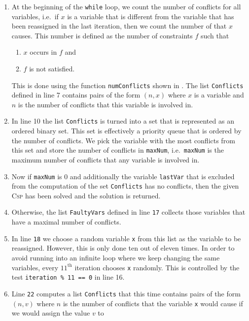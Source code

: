 \begin{enumerate}
\item At the beginning of the \texttt{while} loop, we count the number of conflicts for all variables, i.e.~if
      $x$ is a variable that is different from the variable that has been reassigned in the last iteration,
      then we count the number of   that $x$ causes.  This number is defined 
      as the number of constraints $f$ such that
      \begin{enumerate}
      \item $x$ occurs in $f$ and
      \item $f$ is not satisfied.
      \end{enumerate}
      This is done using the function \texttt{numConflicts} shown in .
      The list \texttt{Conflicts} defined in line 7 contains pairs of the form $(n, x)$ where $x$ is a
      variable and $n$ is the number of conflicts that this variable is involved in.
\item In line 10 the list \texttt{Conflicts} is turned into a set that is represented as an ordered binary set.
      This set is effectively a 
      priority queue that is ordered by the number of conflicts.  We pick the variable with the most conflicts
      from this set and store the number of conflicts in \texttt{maxNum}, i.e.~\texttt{maxNum} is the maximum
      number of conflicts that any variable is involved in.
\item Now if \texttt{maxNum} is $0$ and additionally the variable \texttt{lastVar} that is excluded from the
      computation of the set \texttt{Conflicts} has no conflicts, then the given \textsc{Csp} has been solved and
      the solution is returned.
\item Otherwise, the list  \texttt{FaultyVars} defined in line \texttt{17} collects those variables that have a maximal
      number of conflicts.  
\item In line \texttt{18} we choose a random variable \texttt{x} from this list as the variable to be
      reassigned.  However, this is only done ten out of eleven times.  In order to avoid running into an
      infinite loop where we keep changing the same variables, every $11^\textrm{th}$ iteration chooses
      \texttt{x} randomly.  This is controlled by the  test \texttt{iteration \% 11 == 0} in line 16.
\item Line \texttt{22} computes a list \texttt{Conflicts} that this time contains pairs of the form $(n, v)$ where $n$ 
      is the number of conflicts that the variable \texttt{x} would cause if we would assign the value $v$ to

\end{enumerate}
